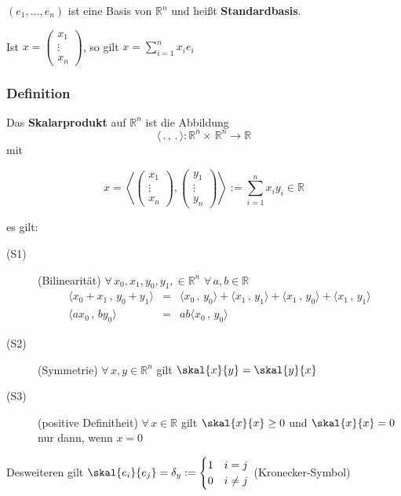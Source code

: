 \((e_1,\dots,e_n)\) ist eine Basis von $\mathbb{R}^n$ und heißt {\bfseries Standardbasis}. 

Ist \(x = \begin{pmatrix} x_1 \\ \vdots \\ x_n \end{pmatrix}\), so gilt \(x=\sum\limits^{n}_{i=1}x_ie_i\)

\subsubsection[Das Skalarprodukt]{Definition} %
\label{ssub:definition}

Das {\bfseries Skalarprodukt} auf $\mathbb{R}^n$ ist die Abbildung \[ \langle\, .\,,\,.\,\rangle : \mathbb{R}^n \times \, \mathbb{R}^n \to \mathbb{R}\] mit 

\[
 x = \left< \begin{pmatrix} x_1 \\ \vdots \\ x_n \end{pmatrix} , \begin{pmatrix} y_1 \\ \vdots \\ y_n \end{pmatrix} \right> := \sum_{i=1}^{n}x_iy_i \in \mathbb{R} 
 \]
 
es gilt:
\begin{description}
	\item[(S1)] (Bilinearität) $\forall \, x_0,x_1,y_0,y_1, \in \mathbb{R}^n \hspace{4pt} \forall \, a,b \in \mathbb{R}$
	 \begin{eqnarray}
	 \langle x_0+x_1\,,\, y_0+y_1\rangle & =& \langle x_0\,,\, y_0\rangle + \langle x_1\,,\,y_1\rangle + \langle x_1\,,\, y_0\rangle + \langle x_1\,,\, y_1\rangle \\
	 \langle ax_0\,,\, by_0\rangle &=& ab \langle x_0\,,\, y_0\rangle 
	 \end{eqnarray}
	 \item[(S2)](Symmetrie) $\forall \, x,y \in \mathbb{R}^n$ gilt $\skal{x}{y} = \skal{y}{x}$
	
	\item[(S3)](positive Definitheit) $\forall \, x \in \mathbb{R}$ gilt $\skal{x}{x} \geq 0$ und $\skal{x}{x}=0$ nur dann, wenn $x=0$
\end{description}
Desweiteren gilt $\skal{e_i}{e_j}=\delta_y := \begin{cases} 1 & i=j \\ 0 &i\neq j \end{cases}$ \hspace{1cm} (Kronecker-Symbol)

